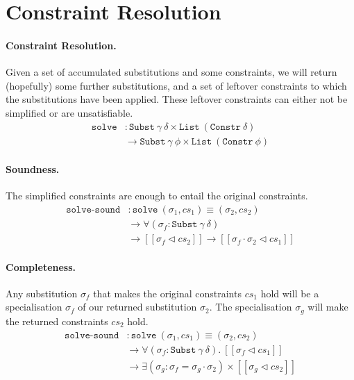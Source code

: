 \documentclass[sigplan,screen,review]{acmart}
\begin{document}
\hypertarget{constraint-resolution}{%
\section{Constraint Resolution}\label{constraint-resolution}}


\cite{McBride03}

\paragraph{Constraint Resolution.}

Given a set of accumulated substitutions and some constraints, we will
return (hopefully) some further substitutions, and a set of leftover
constraints to which the substitutions have been applied. These leftover
constraints can either not be simplified or are unsatisfiable. \[
\begin{aligned}
\texttt{solve} &: \texttt{Subst}~\gamma~\delta \times \texttt{List}~(\texttt{Constr}~\delta) \\
&\to \texttt{Subst}~\gamma~\phi \times \texttt{List}~(\texttt{Constr}~\phi)
\end{aligned}
\]

\paragraph{Soundness.}

The simplified constraints are enough to entail the original
constraints. \[
\begin{aligned}
\texttt{solve-sound}
&: \texttt{solve}~(\sigma_1, cs_1) \equiv (\sigma_2, cs_2) \\
&\to \forall (\sigma_f : \texttt{Subst}~\gamma~\delta) \\
& \to [\![ \sigma_f \triangleleft cs_2 ]\!] \to [\![ \sigma_f \cdot \sigma_2 \triangleleft cs_1 ]\!]
\end{aligned}
\]

\paragraph{Completeness.}

Any substitution \(\sigma_f\) that makes the original constraints
\(cs_1\) hold will be a specialisation \(\sigma_f\) of our returned
substitution \(\sigma_2\). The specialisation \(\sigma_g\) will make the
returned constraints \(cs_2\) hold. \[
\begin{aligned}
\texttt{solve-sound}
&: \texttt{solve}~(\sigma_1, cs_1) \equiv (\sigma_2, cs_2) \\
&\to \forall (\sigma_f : \texttt{Subst}~\gamma~\delta). ~ [\![ \sigma_f \triangleleft cs_1 ]\!] \\
&\to \exists (\sigma_g : \sigma_f = \sigma_g \cdot \sigma_2) \times [\![ \sigma_g \triangleleft cs_2 ]\!]
\end{aligned}
\]
\end{document}
